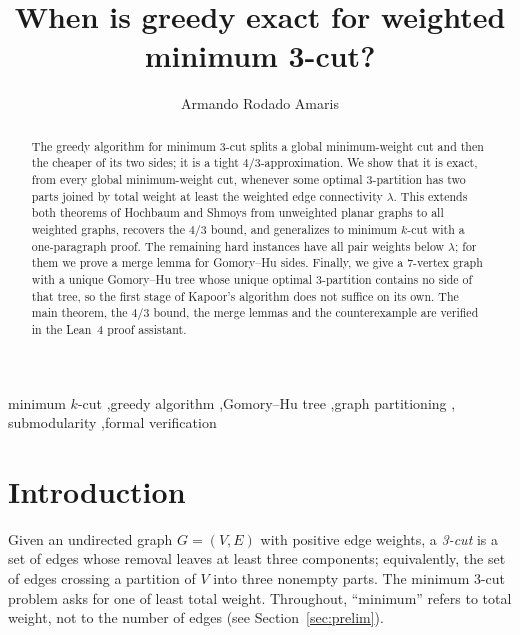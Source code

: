 \documentclass[preprint,12pt]{elsarticle}
\theoremstyle{definition}
\begin{document}
\begin{frontmatter}

\title{When is greedy exact for weighted minimum 3-cut?}

\author{Armando Rodado Amaris}

\begin{abstract}
The greedy algorithm for minimum 3-cut splits a global minimum-weight cut and then the cheaper of its
two sides; it is a tight $4/3$-approximation. We show that it is exact, from every global
minimum-weight cut, whenever some optimal 3-partition has two parts joined by total weight at least
the weighted edge connectivity $\lambda$. This extends both theorems of Hochbaum and Shmoys from
unweighted planar graphs to all weighted graphs, recovers the $4/3$ bound, and generalizes to minimum
$k$-cut with a one-paragraph proof. The remaining hard instances have all pair weights below
$\lambda$; for them we prove a merge lemma for Gomory--Hu sides. Finally, we give a 7-vertex graph
with a unique Gomory--Hu tree whose unique optimal 3-partition contains no side of that tree, so the
first stage of Kapoor's algorithm does not suffice on its own. The main theorem, the $4/3$ bound,
the merge lemmas and the counterexample are verified in the Lean~4 proof assistant.
\end{abstract}

\begin{keyword}
minimum $k$-cut \sep greedy algorithm \sep Gomory--Hu tree \sep graph partitioning \sep
submodularity \sep formal verification
\end{keyword}

\end{frontmatter}

\section{Introduction}

Given an undirected graph $G=(V,E)$ with positive edge weights, a \emph{3-cut} is a set of edges whose
removal leaves at least three components; equivalently, the set of edges crossing a partition of $V$
into three nonempty parts. The minimum 3-cut problem asks for one of least total weight. Throughout,
``minimum'' refers to total weight, not to the number of edges (see Section~\ref{sec:prelim}).
\end{document}
